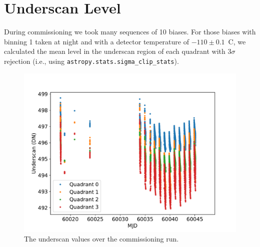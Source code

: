 \documentclass{article}
\begin{document}
\clearpage
\section{Underscan Level}

During commissioning we took many sequences of 10 biases. For those biases with binning 1 taken at night and with a detector temperature of $-110\pm0.1$~C, we calculated the mean level in the underscan region of each quadrant with $3\sigma$ rejection (i.e., using \verb|astropy.stats.sigma_clip_stats|).

\begin{figure}[pb]
\begin{center}
\includegraphics[width=0.7\columnwidth]{figures/underscan-time.pdf}
\medskip
\caption{The underscan values over the commissioning run.}
\label{figure:underscan-time}
\end{center}
\end{figure}
\end{document}
